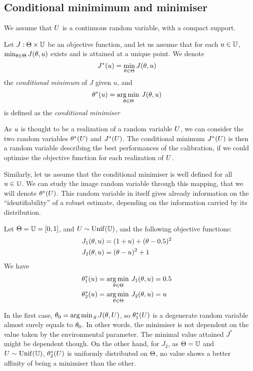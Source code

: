 \documentclass[../../Main_ManuscritThese.tex]{subfiles}
\begin{document}
\subsection{Conditional minimimum and minimiser}
\label{sec:MPE}
We assume that $U$ is a continuous random variable, with a compact
support.
\begin{definition}
  Let $J: \Theta \times \mathbb{U}$ be an objective function, and let us
  assume that for each $u \in \mathbb{U}$,
  $\min_{\theta \in \Theta} J(\theta,u)$ exists and is attained at a
  unique point.  We denote
  \begin{equation}
    J^*(u) = \min_{\theta \in \Theta} J(\theta,u)
  \end{equation}
  the \emph{conditional minimum} of $J$ given $u$, and
  \begin{equation}
    \label{eq:def_kstar}
    \theta^*(u) = \operatorname*{arg\,min \,}_{\theta\in\Theta} J(\theta, u)
  \end{equation}
 is defined as the \emph{conditional minimiser}
\end{definition}
As $u$ is thought to be a realization of a random variable $U$, we
can consider the two random variables $\theta^*(U)$ and $J^*(U)$.
The conditional minimum $J^*(U)$ is then a random variable
describing the best performances of the calibration, if we could
optimise the objective function for each realization of $U$.

Similarly, let us assume that the conditional minimiser is well
defined for all $u\in \mathbb{U}$. We can study the image random
variable through this mapping, that we will denote $\theta^*(U)$.  This
random variable in itself gives already information on the
``identifiability'' of a robust estimate, depending on the information
carried by its distribution.
\begin{example}
Let $\Theta = \mathbb{U}= [0, 1]$, and $U \sim \mathrm{Unif}(\mathbb{U})$, and the following objective functions:
\begin{align}
  J_1(\theta, u) &= (1+u)+(\theta - 0.5)^2\\
  J_2(\theta, u) &= (\theta-u)^2 + 1
\end{align}
We have
\begin{align}
  \theta^*_1(u) &= \operatorname*{arg\,min \,}_{\theta \in \Theta} J_1(\theta, u) = 0.5 \\
  \theta^*_2(u) &= \operatorname*{arg\,min \,}_{\theta\in\Theta} J_2(\theta, u) = u
\end{align}

In the first case, $\theta_0 = \operatorname*{arg\,min \,}_{\theta} J(\theta, U)$, so
$\theta_1^*(U)$ is a degenerate random variable almost surely equals to
$\theta_0$. In other words, the minimiser is not dependent on the value
taken by the environmental parameter. The minimal value attained $J^*$
might be dependent though. On the other hand, for $J_2$, as
$\Theta=\mathbb{U}$ and $U \sim \mathrm{Unif}(\mathbb{U})$,
$\theta_2^*(U)$ is uniformly distributed on $\Theta$, no value shows a
better affinity of being a minimiser than the other.
\end{example}
\end{document}
